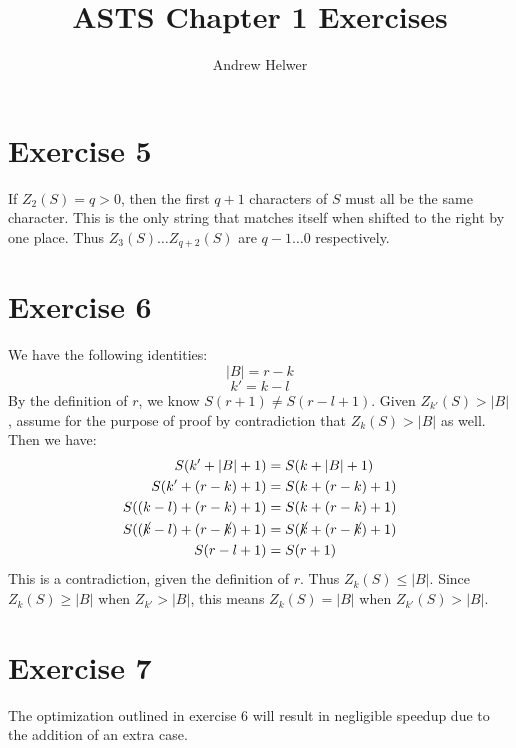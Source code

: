 \documentclass{article}
\begin{document}
\title{ASTS Chapter 1 Exercises}
\author{Andrew Helwer}
\maketitle

\section{Exercise 5}

If $Z_{2}(S) = q > 0$, then the first $q+1$ characters of $S$ must all be the same character. This is the only string that matches itself when shifted to the right by one place. Thus $Z_{3}(S) \ldots Z_{q+2}(S)$ are $q-1 \ldots 0$ respectively.

\section{Exercise 6}

We have the following identities:
\begin{equation}
|B| = r - k
\end{equation}
\begin{equation}
    k' = k - l
\end{equation}
By the definition of $r$, we know $S(r+1) \neq S(r-l+1)$. Given $Z_{k'}(S) > |B|$, assume for the purpose of proof by contradiction that $Z_{k}(S) > |B|$ as well. Then we have:
\begin{align}
    S(k' + |B| + 1) &= S(k + |B| + 1) \\ 
  S(k' + (r-k) + 1) &= S(k + (r-k) + 1) \\
    S((k-l) + (r-k) + 1) &= S(k + (r-k) + 1) \\
    S((\cancel{k}-l) + (r-\cancel{k}) + 1) &= S(\cancel{k} + (r - \cancel{k}) + 1) \\
                                  S(r-l+1) &= S(r+1)
\end{align}
This is a contradiction, given the definition of $r$. Thus $Z_{k}(S) \leq |B|$. Since $Z_{k}(S) \geq |B|$ when $Z_{k'} > |B|$, this means $Z_{k}(S) = |B|$ when $Z_{k'}(S) > |B|$.

\section{Exercise 7}

The optimization outlined in exercise 6 will result in negligible speedup due to the addition of an extra case.
\end{document}
